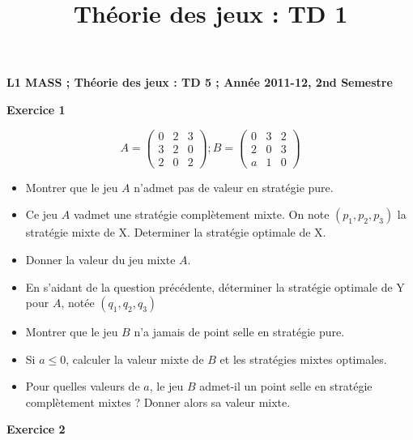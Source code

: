 \documentclass[12pt]{article}
\title{Th\'eorie des jeux : TD 1}
\date{}
\begin{document}
\pagestyle{empty}

\textbf{L1 MASS ;   Th\'eorie des jeux : TD 5    ;      Ann\'ee 2011-12, 2nd Semestre}
\medskip
\medskip
\medskip

\begin{center}
\textbf{Exercice 1}
\end{center}


\begin{equation*}
A=\begin{pmatrix}
0&2&3\\
3&2&0\\
2&0&2
\end{pmatrix};
B=\begin{pmatrix}
0&3&2\\
2&0&3\\
a&1&0
\end{pmatrix}
\end{equation*}

\begin{itemize}
\item Montrer que le jeu $A$ n'admet pas de valeur en strat\'egie pure. 
\item Ce jeu $A$ vadmet une strat\'egie compl\`etement mixte. On note $(p_1, p_2, p_3)$ la strat\'egie mixte de X. Determiner la strat\'egie optimale de X.
\item Donner la valeur du jeu mixte $A$.
\item En s'aidant de la question pr\'ec\'edente, d\'eterminer la strat\'egie optimale de Y pour $A$, not\'ee $(q_1, q_2, q_3)$
\item Montrer que le jeu $B$ n'a jamais de point selle en strat\'egie pure.
\item Si $a\leq 0$, calculer la valeur mixte de $B$ et les strat\'egies mixtes optimales.
\item Pour quelles valeurs de $a$, le jeu $B$ admet-il un point selle en strat\'egie compl\`etement mixtes ? 
Donner alors sa valeur mixte.
\end{itemize}



\begin{center}
\textbf{Exercice 2}
\end{center}
\end{document}
